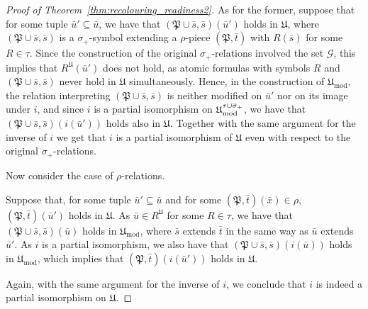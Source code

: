 \documentclass[oneside,reqno,12pt]{amsart}
\theoremstyle{plain}
\theoremstyle{remark}
\newenvironment{claimproof}[1][\proofname]
{\renewcommand\qedsymbol{$\diamond$}\proof[#1]}
{\endproof}
\newcommand{\struct}[1]{\mathfrak{#1}}
\newcommand{\cplmt}[1]{\smash{\overline{#1}}}
\DeclareMathOperator{\mo}{mod}
\begin{document}
{\begin{proof}[Proof of Theorem~\ref{thm:recolouring_readiness2}]
\begin{claimproof}
As for the former, suppose that for some tuple $\bar u'\subseteq\bar u$, we have that $(\struct P\cup \bar s,\bar s)(\bar u')$ holds in $\struct U$, where $(\struct P\cup \bar s,\bar s)$ is a  $\sigma_+$-symbol   extending a $\rho$-piece $(\struct P,\bar t)$ with $R(\bar s)$ for some $R\in \tau$. Since the construction of the original $\sigma_+$-relations involved the set $\mathcal G$, this implies that $R^{\struct U}(\bar u')$ does not hold, as atomic formulas with symbols $R$ and $(\struct P\cup \bar s,\bar s)$ never hold in $\struct{U}$ simultaneously. Hence, in the construction of $\struct U_{\mo}$, the relation interpreting $(\struct P\cup \bar s,\bar s)$ is neither modified on $\bar u'$ nor on its image under $i$, and since $i$ is a partial isomorphism on $\struct U_{\mo}^{\tau\cup\cplmt{\sigma}_+}$, we have that $(\struct P\cup \bar s,\bar s)(i(\bar u'))$ holds also in $\struct U$. Together with the same argument for  the inverse of $i$ we get that $i$ is a partial isomorphism of $\struct{U}$ even with respect to the original $\sigma_+$-relations.

Now consider the  case of $\rho$-relations. 


Suppose that, for some tuple $\bar u'\subseteq\bar u$ and for some $(\struct P,\bar t)(\bar x)\in\rho$, $(\struct P,\bar t)(\bar u')$ holds in $\struct{U}$.
As $\bar u\in R^\struct{U}$ for some $R\in\tau$, we have that $(\struct P\cup \bar s,\bar s)(\bar u)$ holds in $\struct{U}_{\mo}$, where $\bar s$ extends $\bar t$ in the same way as $\bar u$ extends $\bar u'$.
As $i$ is a partial isomorphism, we also have that $(\struct P\cup \bar s,\bar s)(i(\bar u))$ holds in $\struct{U}_{\mo}$, which implies that $(\struct P,\bar t)(i(\bar u'))$ holds in $\struct{U}$.

Again, with the same argument for the inverse of $i$, we conclude that $i$ is indeed a partial isomorphism on $\struct U$.
\end{claimproof}


\end{proof}}
\end{document}
